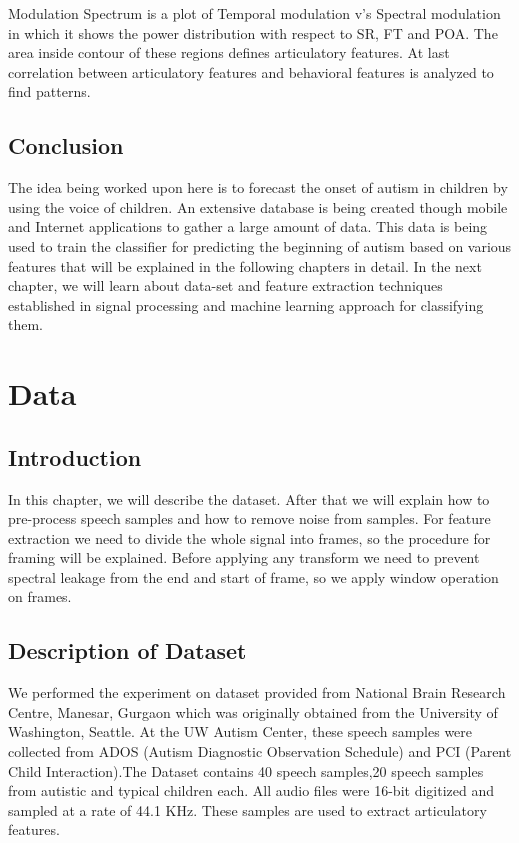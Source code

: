 \documentclass[11pt]{report}
\begin{document}
Modulation Spectrum is a plot of Temporal modulation v's Spectral modulation in which it shows the power distribution with respect to SR, FT and POA. The area inside contour of these regions defines articulatory features. At last correlation between articulatory features and behavioral features is analyzed to find patterns.




\section{Conclusion}
The idea being worked upon here is to forecast the onset of autism in children by using the voice of children. An extensive database is being created though mobile and Internet applications to gather a large amount of data. This data is being used to train the classifier for predicting the beginning of autism based on various features that will be explained in the following chapters in detail. In the next chapter, we will learn about data-set and feature extraction techniques established in signal processing and machine learning approach for classifying them.


\newpage
\chapter{Data}
\section{Introduction}
In this chapter, we will describe the dataset. After that we will explain how to pre-process speech samples and how to remove noise from samples. For feature extraction we need to divide the whole signal into frames, so the procedure for framing will be explained. Before applying any transform we need to prevent spectral leakage from the end and start of frame, so we apply window operation on frames.

\section{Description of Dataset} 
 We performed the experiment on dataset provided from National Brain Research Centre, Manesar, Gurgaon which was originally obtained from the University of Washington, Seattle. At the UW Autism Center, these speech samples were collected from ADOS (Autism Diagnostic Observation Schedule) and PCI (Parent Child Interaction).The  Dataset contains 40 speech samples,20 speech samples from autistic and typical children each. All audio files were 16-bit digitized and sampled at a rate of 44.1 KHz. These samples are used to extract articulatory features.
\end{document}
